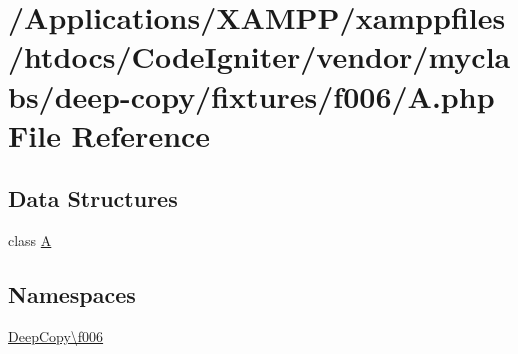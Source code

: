 \hypertarget{f006_2_a_8php}{}\section{/\+Applications/\+X\+A\+M\+P\+P/xamppfiles/htdocs/\+Code\+Igniter/vendor/myclabs/deep-\/copy/fixtures/f006/A.php File Reference}
\label{f006_2_a_8php}
\subsection*{Data Structures}
\begin{DoxyCompactItemize}
\item 
class \mbox{\hyperlink{class_deep_copy_1_1f006_1_1_a}{A}}
\end{DoxyCompactItemize}
\subsection*{Namespaces}
\begin{DoxyCompactItemize}
\item 
 \mbox{\hyperlink{namespace_deep_copy_1_1f006}{Deep\+Copy\textbackslash{}f006}}
\end{DoxyCompactItemize}
